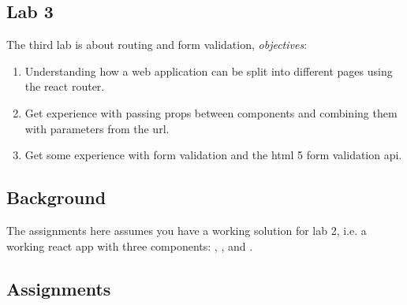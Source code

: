 \documentclass[fleqn, article, a4paper]{memoir}
\begin{document}
\maketitle
\thispagestyle{titlepage}
\vspace{-4cm}

\subsection*{Lab 3}

\n The third lab is about routing and form validation, \emph{objectives}:

\begin{enumerate}\firmlist
\item Understanding how a web application can be split into different pages using the react router.
\item Get experience with passing props between components and combining them with parameters from the url.
\item Get some experience with form validation and the html 5 form validation api.
\end{enumerate}

\subsection*{Background}

The assignments here assumes you have a working solution for lab 2, i.e. a working react app with three components: , , and .

\subsection*{Assignments}
\end{document}

